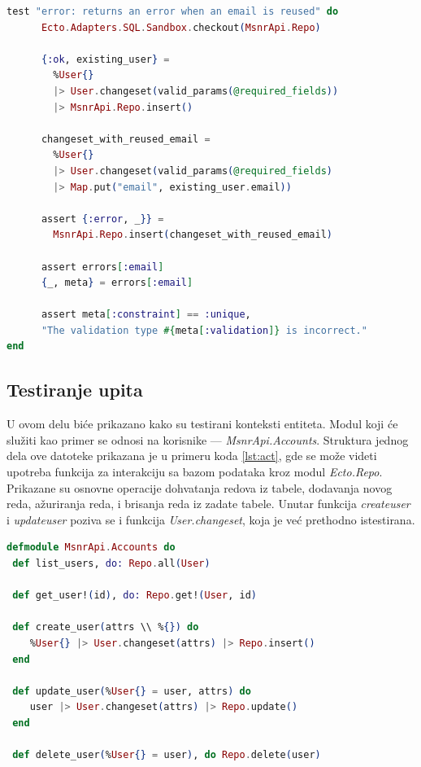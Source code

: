 \documentclass[12pt,oneside]{memoir}
\begin{document}
\begin{minipage}{\linewidth}
\begin{lstlisting}[language=elixir, basicstyle=\small, caption={Test primer neuspešne upotrebe funkcije \emph{changeset/2}, pri narušavanju ograničenja jedinstvenosti},captionpos=b, label={lst:uniq}]
test "error: returns an error when an email is reused" do
      Ecto.Adapters.SQL.Sandbox.checkout(MsnrApi.Repo)

      {:ok, existing_user} =
        %User{}
        |> User.changeset(valid_params(@required_fields))
        |> MsnrApi.Repo.insert()
        
      changeset_with_reused_email =
        %User{}
        |> User.changeset(valid_params(@required_fields)
        |> Map.put("email", existing_user.email))

      assert {:error, _}} =
        MsnrApi.Repo.insert(changeset_with_reused_email)

      assert errors[:email]
      {_, meta} = errors[:email]

      assert meta[:constraint] == :unique,
      "The validation type #{meta[:validation]} is incorrect."
end
\end{lstlisting}
\end{minipage}

\subsection{Testiranje upita}
\par U ovom delu biće prikazano kako su testirani konteksti entiteta. Modul koji će služiti kao primer se odnosi na korisnike --- \emph{MsnrApi.Accounts}. Struktura jednog dela ove datoteke prikazana je u primeru koda \ref{lst:act}, gde se može videti upotreba funkcija za interakciju sa bazom podataka kroz modul \emph{Ecto.Repo}. Prikazane su osnovne operacije dohvatanja redova iz tabele, dodavanja novog reda, ažuriranja reda, i brisanja reda iz zadate tabele. Unutar funkcija \emph{create{\textunderscore}user} i \emph{update{\textunderscore}user} poziva se i funkcija \emph{User.changeset}, koja je već prethodno istestirana.  \\

\begin{minipage}{\linewidth}
\begin{lstlisting}[language=elixir, basicstyle=\small, caption={Definicija modula \emph{MsnrApi.Accounts}},captionpos=b, label={lst:act}]
defmodule MsnrApi.Accounts do
 def list_users, do: Repo.all(User)
  
 def get_user!(id), do: Repo.get!(User, id)

 def create_user(attrs \\ %{}) do
    %User{} |> User.changeset(attrs) |> Repo.insert()
 end

 def update_user(%User{} = user, attrs) do
    user |> User.changeset(attrs) |> Repo.update()
 end

 def delete_user(%User{} = user), do Repo.delete(user)
\end{lstlisting}
\end{minipage}
\end{document}
